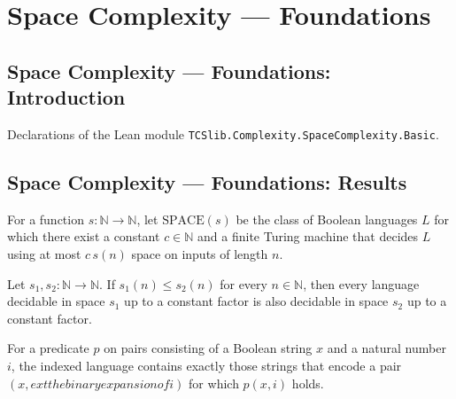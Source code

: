 \section{Space Complexity --- Foundations}
\subsection*{Space Complexity --- Foundations: Introduction}

Declarations of the Lean module \texttt{TCSlib.Complexity.SpaceComplexity.Basic}.

\subsection*{Space Complexity --- Foundations: Results}

\begin{definition}
\label{Complexity.SPACE}
\leanok
{}
For a function $s:\mathbb{N}\to\mathbb{N}$, let $\mathrm{SPACE}(s)$ be the class of
Boolean languages $L$ for which there exist a constant $c\in\mathbb{N}$ and a finite
Turing machine that decides $L$ using at most $c\,s(n)$ space on inputs of length $n$.
\end{definition}

\begin{theorem}
\label{Complexity.SPACE.mono}
\leanok
{}
Let $s_1,s_2:\mathbb{N}\to\mathbb{N}$. If $s_1(n)\le s_2(n)$ for every $n\in\mathbb{N}$,
then every language decidable in space $s_1$ up to a constant factor is also decidable
in space $s_2$ up to a constant factor.
\end{theorem}

\begin{theorem}
\label{Complexity.indexLang}
\leanok
{}
For a predicate $p$ on pairs consisting of a Boolean string $x$ and a natural number
$i$, the indexed language contains exactly those strings that encode a pair $(x,	ext{the
binary expansion of }i)$ for which $p(x,i)$ holds.
\end{theorem}

